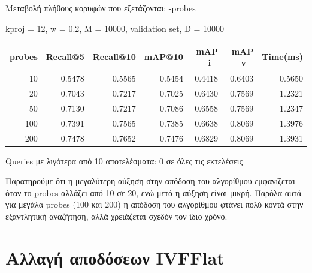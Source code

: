 \documentclass [conference]{IEEEtran}
\begin{document}
Μεταβολή πλήθους κορυφών που εξετάζονται: -probes
\begin{table}[H]
    \centering
    \footnotesize
    \setlength{\tabcolsep}{3pt}
    kproj = 12, w = 0.2, M = 10000, validation set, D = 10000
    \par\smallskip
    \begin{tabular}{r r r r r r r}
    \hline
    \textbf{probes} & \textbf{Recall@5} & \textbf{Recall@10} & \textbf{mAP@10} & \textbf{mAP i\_} & \textbf{mAP v\_} & \textbf{Time(ms)} \\
    \hline
    10  & 0.5478 & 0.5565 & 0.5454 & 0.4418 & 0.6403 & 0.5650 \\
    20  & 0.7043 & 0.7217 & 0.7025 & 0.6430 & 0.7569 & 1.2321 \\
    50  & 0.7130 & 0.7217 & 0.7086 & 0.6558 & 0.7569 & 1.2347 \\
    100 & 0.7391 & 0.7565 & 0.7385 & 0.6638 & 0.8069 & 1.3976 \\
    200 & 0.7478 & 0.7652 & 0.7476 & 0.6829 & 0.8069 & 1.3931 \\
    \hline
    \end{tabular}
    \par\smallskip
    \footnotesize Queries με λιγότερα από 10 αποτελέσματα: 0 σε όλες τις εκτελέσεις
\end{table}

Παρατηρούμε ότι η μεγαλύτερη αύξηση στην απόδοση του αλγορίθμου εμφανίζεται όταν το probes αλλάζει από 10 σε 20, ενώ μετά η αύξηση είναι μικρή. Παρόλα αυτά για μεγάλα probes (100 και 200) η απόδοση του αλγορίθμου φτάνει πολύ κοντά στην εξαντλητική αναζήτηση, αλλά χρειάζεται σχεδόν τον ίδιο χρόνο.

\section{Αλλαγή αποδόσεων IVFFlat}
\end{document}
